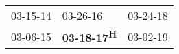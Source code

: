 \begin{supertabular}{lll}
 03-15-14\textsuperscript{} &            03-26-16\textsuperscript{} &  03-24-18\textsuperscript{} \\
 03-06-15\textsuperscript{} &  \textbf{03-18-17\textsuperscript{H}} &  03-02-19\textsuperscript{} \\
\end{supertabular}
